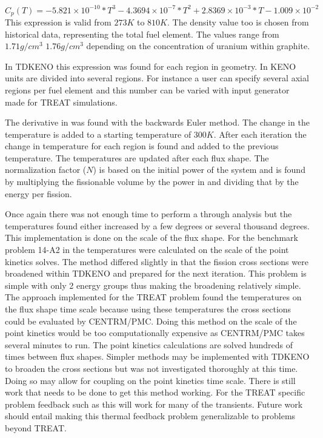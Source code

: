 \documentclass[11pt]{article}
\begin{document}
\begin{equation}
    C_p(T) = -5.821 \times 10^{-10}*T^3 - 4.3694\times 10^{-7}*T^2 + 2.8369\times 10^{-3}*T - 1.009\times 10^{-2}
\end{equation}
This expression is valid from $273K$ to $810K$. The density value too is chosen from historical data, representing the total fuel element.   The values range from $1.71 g/cm^3$ $1.76g/cm^3$ depending on the concentration of uranium within graphite. 

In TDKENO this expression was found for each region in  geometry.  In KENO units are divided into several regions. For instance a user can specify several axial regions per fuel element and this number can be varied with input generator made for TREAT simulations.  

The derivative in \label{adiabatic} was found with the backwards Euler method. The change in the temperature is added to a starting temperature of $300K$.  After each iteration the change in temperature for each region is found and added to the previous temperature. The temperatures are updated after each flux shape. The normalization factor ($N$) is based on the initial power of the system and is found by multiplying the fissionable volume by the power in and dividing that by the energy per fission. 

Once again there was not enough time to perform a through analysis but the temperatures found either increased by a few degrees or several thousand degrees.  This implementation is done on the scale of the flux shape.  For the benchmark problem 14-A2 in \cite{Bentley} the temperatures were calculated on the scale of the point kinetics solves.  The method differed slightly in that the fission cross sections were broadened within TDKENO and prepared for the next iteration.  This problem is simple with only 2 energy groups thus making the broadening relatively simple.  The approach implemented for the TREAT problem found the temperatures on the flux shape time scale because using these  temperatures the cross sections could be evaluated by CENTRM/PMC.  Doing this method on the scale of the point kinetics would be too computationally expensive as CENTRM/PMC takes several minutes to run. The point kinetics calculations are solved hundreds of times between flux shapes.  Simpler methods may be implemented with TDKENO to broaden the cross sections but was not investigated thoroughly at this time.  Doing so may allow for coupling on the point kinetics time scale.   There is still work that needs to be done to get this method working.  For the TREAT specific problem feedback such as this will work for many of the transients. Future work should entail making this thermal feedback problem generalizable to problems beyond TREAT. 
\end{document}
